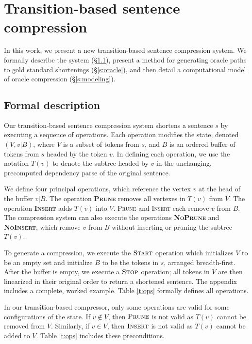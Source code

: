 \documentclass[11pt,a4paper]{article}
\begin{document}
\section{Transition-based sentence compression}\label{s:system}

In this work, we present a new transition-based sentence compression system. We formally describe the system (\S\ref{s:formal}), present a method for generating oracle paths to gold standard shortenings (\S\ref{s:oracle}), and then detail a computational model of oracle compression (\S\ref{s:modeling}).

\subsection{Formal description}\label{s:formal}

Our transition-based sentence compression system shortens a sentence $s$ by executing a sequence of operations. Each operation modifies the state, denoted $(V,v|B)$, where $V$ is a subset of tokens from $s$, and $B$ is an ordered buffer of tokens from $s$ headed by the token $v$. In defining each operation, we use the notation $T(v)$ to denote the subtree headed by $v$ in the unchanging, precomputed dependency parse of the original sentence.

We define four principal operations, which reference the vertex $v$ at the head of the buffer $v|B$. The operation \textbf{\textsc{Prune}} removes all vertexes in $T(v)$ from $V$. The operation \textbf{\textsc{Insert}} adds $T(v)$ into $V$. \textsc{Prune} and \textsc{Insert} each remove $v$ from $B$. The compression system can also execute the operations \textbf{\textsc{NoPrune}} and \textbf{\textsc{NoInsert}}, which remove $v$ from $B$ without inserting or pruning the subtree $T(v)$. 

To generate a compression, we execute the $\textsc{Start}$ operation which initializes $V$ to be an empty set and initialize $B$ to be the tokens in $s$, arranged breadth-first. After the buffer is empty, we execute a $\textsc{Stop}$ operation; all tokens in $V$ are then linearized in their original order to return a shortened sentence. The appendix includes a complete, worked example. Table \ref{t:ops} formally defines all operations. 

In our transition-based compressor, only some operations are valid for some configurations of the state. If $v \notin V$, then $\textsc{Prune}$ is not valid as $T(v)$ cannot be removed from $V$. Similarly, if $v \in V$, then $\textsc{Insert}$ is not valid as $T(v)$ cannot be added to $V$. Table \ref{t:ops} includes these preconditions.
\end{document}
